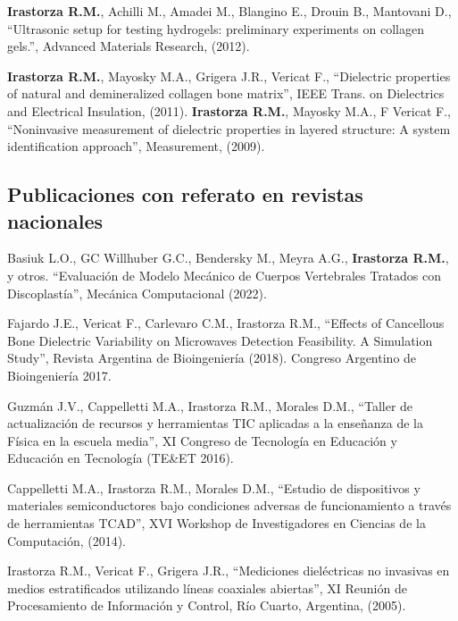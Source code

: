 \documentclass[margin,line]{res}
\begin{document}
\begin{resume}
\textbf{Irastorza R.M.}, Achilli M., Amadei M., Blangino E., Drouin B., Mantovani D., ``Ultrasonic setup for testing hydrogels: preliminary experiments on collagen gels.'', Advanced Materials Research, (2012).

\textbf{Irastorza R.M.}, Mayosky M.A., Grigera J.R., Vericat F., ``Dielectric properties of natural and demineralized collagen bone matrix'', IEEE Trans. on Dielectrics and Electrical Insulation, (2011).
%
%
{\bf Irastorza R.M.}, Mayosky M.A., F Vericat F., ``Noninvasive measurement of dielectric properties in layered structure: A system identification approach'', Measurement, (2009).

\subsection{ Publicaciones con referato en revistas nacionales}

Basiuk L.O., GC Willhuber G.C., Bendersky M., Meyra A.G., \textbf{Irastorza R.M.}, y otros. ``Evaluación de Modelo Mecánico de Cuerpos Vertebrales Tratados con Discoplastía'', Mecánica Computacional (2022).

Fajardo J.E., Vericat F., Carlevaro C.M., Irastorza R.M., ``Effects of Cancellous Bone Dielectric Variability on Microwaves Detection Feasibility. A Simulation Study'', Revista Argentina de Bioingeniería  (2018). Congreso Argentino de Bioingeniería 2017.

Guzmán J.V., Cappelletti M.A., Irastorza R.M., Morales D.M., ``Taller de actualización de recursos y herramientas TIC aplicadas a la enseñanza de la Física en la escuela media'', XI Congreso de Tecnología en Educación y Educación en Tecnología (TE\&ET 2016).

Cappelletti M.A., Irastorza R.M., Morales D.M., ``Estudio de dispositivos y materiales semiconductores bajo condiciones adversas de funcionamiento a través de herramientas TCAD'', XVI Workshop de Investigadores en Ciencias de la Computación, (2014).

Irastorza R.M., Vericat F., Grigera J.R., ``Mediciones dieléctricas no invasivas en medios estratificados utilizando líneas coaxiales abiertas'', XI Reunión de Procesamiento de Información y Control, Río Cuarto, Argentina, (2005).


\end{resume}
\end{document}
